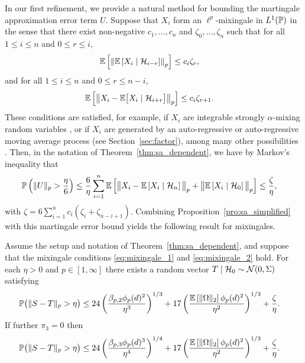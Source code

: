 In our first refinement, we provide a natural method for bounding the
martingale approximation error term $U$. Suppose that $X_i$ form an
$\ell^p$-mixingale in $L^1(\P)$ in the sense that there exist non-negative
$c_1, \ldots, c_n$ and $\zeta_0, \ldots, \zeta_n$ such that for all
$1 \leq i \leq n$ and $0 \leq r \leq i$,
%
\begin{align}
  \label{eq:mixingale_1}
  \E \left[ \left\|
    \E \left[ X_i \mid \cH_{i-r} \right]
    \right\|_p \right]
  &\leq
  c_i \zeta_r,
\end{align}
%
and for all $1 \leq i \leq n$ and $0 \leq r \leq n-i$,
%
\begin{align}
  \label{eq:mixingale_2}
  \E \left[ \big\|
    X_i - \E \big[ X_i \mid \cH_{i+r} \big]
    \big\|_p \right]
  &\leq
  c_i \zeta_{r+1}.
\end{align}
%
These conditions are satisfied, for example, if $X_i$ are integrable strongly
$\alpha$-mixing random variables \citep{mcleish1975invariance}, or if $X_i$ are
generated by an auto-regressive or auto-regressive moving average process (see
Section~\ref{sec:factor}), among many other possibilities
\citep{bradley2005basic}. Then, in the notation of
Theorem~\ref{thm:sa_dependent}, we have by Markov's inequality that
%
\begin{align*}
  \P \left( \|U\|_p > \frac{\eta}{6} \right)
  &\leq
  \frac{6}{\eta}
  \sum_{i=1}^{n}
  \E \left[
    \big\|
    X_i - \E \left[ X_i \mid \cH_n \right]
    \big\|_p
    + \big\|
    \E \left[ X_i \mid \cH_0 \right]
    \big\|_p
  \right]
  \leq \frac{\zeta}{\eta},
\end{align*}
%
with $\zeta = 6 \sum_{i=1}^{n} c_i (\zeta_{i} + \zeta_{n-i+1})$.
Combining Proposition~\ref{pro:sa_simplified} with this
martingale error bound yields the following result for mixingales.
%
\begin{corollary}%
  \label{cor:sa_mixingale}

  Assume the setup and notation of Theorem~\ref{thm:sa_dependent}, and suppose
  that the mixingale conditions \eqref{eq:mixingale_1} and
  \eqref{eq:mixingale_2} hold. For each $\eta > 0$ and $p \in [1,\infty]$ there
  exists a random vector $T \mid \cH_0 \sim \cN(0, \Sigma)$ satisfying
  \begin{align*}
    \P\big(\|S-T\|_p > \eta\big)
    &\leq
    24 \left(
      \frac{\beta_{p,2} \phi_p(d)^2}{\eta^3}
    \right)^{1/3}
    + 17 \left(
      \frac{\E \left[ \|\Omega\|_2 \right] \phi_p(d)^2}{\eta^2}
    \right)^{1/3}
    + \frac{\zeta}{\eta}.
  \end{align*}
  If further $\pi_3 = 0$ then
  \begin{align*}
    \P\big(\|S-T\|_p > \eta\big)
    &\leq
    24 \left(
      \frac{\beta_{p,3} \phi_p(d)^3}{\eta^4}
    \right)^{1/4}
    + 17 \left(
      \frac{\E \left[ \|\Omega\|_2 \right] \phi_p(d)^2}{\eta^2}
    \right)^{1/3}
    + \frac{\zeta}{\eta}.
  \end{align*}
\end{corollary}

